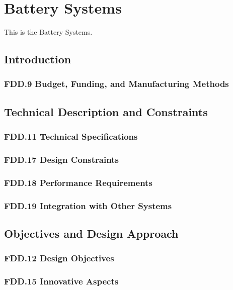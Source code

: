 \section{Battery Systems}
This is the Battery Systems.

\subsection{Introduction}
\subsubsection{FDD.9 Budget, Funding, and Manufacturing Methods}
 
\subsection{Technical Description and Constraints}
\subsubsection{FDD.11 Technical Specifications}
 
\subsubsection{FDD.17 Design Constraints}
 
\subsubsection{FDD.18 Performance Requirements}
 
\subsubsection{FDD.19 Integration with Other Systems}
 
\subsection{Objectives and Design Approach}
\subsubsection{FDD.12 Design Objectives}
 
\subsubsection{FDD.15 Innovative Aspects}
 
